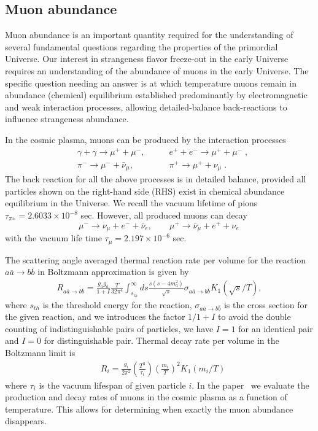 \documentclass[universe,article,submit,moreauthors,pdftex,a4paper]{Definitions/mdpi}
\begin{document}
\subsection{Muon abundance} \label{sec:Muons}
\noindent Muon abundance is an important quantity required for the understanding of several fundamental questions regarding the properties of the primordial Universe. Our interest in strangeness flavor freeze-out in the early Universe~\cite{Yang:2021bko} requires an understanding of the abundance of muons in the early Universe. The specific question needing an answer is at which temperature muons remain in abundance (chemical) equilibrium established predominantly by electromagnetic and weak interaction processes, allowing detailed-balance back-reactions to influence strangeness abundance.

In the cosmic plasma, muons can be produced by the interaction processes 
\begin{align} 
&\gamma+\gamma\longrightarrow\mu^++\mu^-,\qquad & e^++e^-\longrightarrow \mu^++\mu^-\;,\\
&\pi^-\longrightarrow\mu^-+\bar{\nu}_\mu,\qquad & \pi^+\longrightarrow\mu^++\nu_\mu\;.
\end{align}
The back reaction for all the above processes is in detailed balance, provided all particles shown on the right-hand side (RHS) exist in chemical abundance equilibrium in the Universe. We recall the vacuum lifetime of pions $\tau_{\pi^\pm}=2.6033\times10^{-8}$ sec. 
However, all produced muons can decay 
\begin{equation}
\mu^-\rightarrow\nu_\mu+e^-+\bar{\nu}_e,\qquad \mu^+\rightarrow\bar{\nu}_\mu+e^++\nu_e\,
\end{equation} 
with the vacuum life time $\tau_{\mu}=2.197 \times 10^{-6}$ sec. 

The scattering angle averaged thermal reaction rate per volume for the reaction $a\overline{a}\rightarrow b\overline{b}$ in Boltzmann approximation is given by~\cite{Letessier:2002ony}
\begin{align}\label{pairR}
R_{a\overline{a}\rightarrow b\overline{b}}=\frac{g_ag_{\overline{a}}}{1+I}\frac{T}{32\pi^4}\int_{s_{th}}^\infty ds\frac{s(s-4m^2_a)}{\sqrt{s}}\sigma_{a\overline{a}\rightarrow b\overline{b}} K_1(\sqrt{s}/T),
\end{align}
where $s_{th}$ is the threshold energy for the reaction, $\sigma_{a\overline{a}\rightarrow b\overline{b}}$ is the cross section for the given reaction, and we introduces the factor $1/1+I$ to avoid the double counting of indistinguishable pairs of particles, we have $I=1$ for an identical pair and $I=0$ for distinguishable pair.
Thermal decay rate per volume in the Boltzmann limit is~\cite{Kuznetsova:2008jt}
\begin{align}
&R_i=\frac{g_i}{2\pi^2}\left(\frac{T^3}{\tau_i}\right)\left(\frac{m_i}{T}\right)^2K_1(m_i/T) 
\end{align}
where $\tau_i$ is the vacuum lifespan of given particle $i$. In the paper~\cite{Rafelski:2021aey} we evaluate the production and decay rates of muons in the cosmic plasma as a function of temperature. This allows for determining when exactly the muon abundance disappears. 
\end{document}
